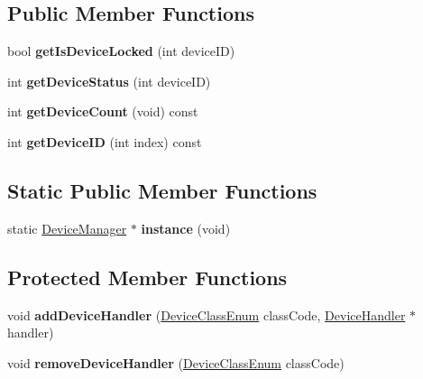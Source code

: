 \subsection*{Public Member Functions}
\begin{DoxyCompactItemize}
\item 
\mbox{\label{class_device_manager_abd187f728edd656556707fdad55f24f2}} 
bool {\bfseries get\+Is\+Device\+Locked} (int device\+ID)
\item 
\mbox{\label{class_device_manager_af96ef91b388d9f62165268fa6e388e0c}} 
int {\bfseries get\+Device\+Status} (int device\+ID)
\item 
\mbox{\label{class_device_manager_a982b59b42355c617b548d1fb7b766664}} 
int {\bfseries get\+Device\+Count} (void) const
\item 
\mbox{\label{class_device_manager_a1d41fc384c0a2d87192506636440c3d1}} 
int {\bfseries get\+Device\+ID} (int index) const
\end{DoxyCompactItemize}
\subsection*{Static Public Member Functions}
\begin{DoxyCompactItemize}
\item 
\mbox{\label{class_device_manager_acce31b85af330247c7d41f278209b265}} 
static \hyperlink{class_device_manager}{Device\+Manager} $\ast$ {\bfseries instance} (void)
\end{DoxyCompactItemize}
\subsection*{Protected Member Functions}
\begin{DoxyCompactItemize}
\item 
\mbox{\label{class_device_manager_ae1ff953a62461bf8326c73fdb509d50e}} 
void {\bfseries add\+Device\+Handler} (\hyperlink{_global_defs_8h_ad17679fac69973be9b3a2787a60d7722}{Device\+Class\+Enum} class\+Code, \hyperlink{class_device_handler}{Device\+Handler} $\ast$handler)
\item 
\mbox{\label{class_device_manager_a37e887fcdbd35963fbfe00006202807f}} 
void {\bfseries remove\+Device\+Handler} (\hyperlink{_global_defs_8h_ad17679fac69973be9b3a2787a60d7722}{Device\+Class\+Enum} class\+Code)
\end{DoxyCompactItemize}
